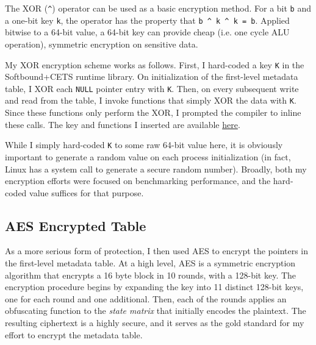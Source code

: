 \documentclass{article}
\begin{document}
        The XOR (\verb|^|) operator can be used as a basic encryption method. For a
        bit \verb|b| and a one-bit key \verb|k|, the operator has the property
        that \verb|b ^ k ^ k = b|. Applied bitwise to a 64-bit value, a 64-bit
        key can provide cheap (i.e. one cycle ALU operation), symmetric 
        encryption on sensitive data.

        \bigbreak{}

        My XOR encryption scheme works as follows. First, I hard-coded a key 
        \verb|K| in the Softbound+CETS runtime library. On initialization of
        the first-level metadata table, I XOR each \verb|NULL| pointer entry
        with \verb|K|. Then, on every subsequent write and read from the table,
        I invoke functions that simply XOR the data with \verb|K|. Since these functions only perform the
        XOR, I prompted the compiler to inline these calls. The key and functions
        I inserted are available \href{https://github.com/parthsarkar17/softboundcets-ese5370/blob/cb8179270000b386616802f150f010230129f169/llvm-project/compiler-rt/lib/softboundcets/softboundcets.cpp#L176}{here}.

        \bigbreak{}

        While I simply hard-coded \verb|K| to some raw 64-bit value here, it 
        is obviously important to generate a random value on each process
        initialization (in fact, Linux has a system call to generate a secure
        random number). Broadly, both my encryption efforts were focused on
        benchmarking performance, and the hard-coded value suffices for that purpose.

    \subsection{AES Encrypted Table}
    
        As a more serious form of protection, I then used AES to encrypt the pointers 
        in the first-level metadata table. At a high level, AES is a symmetric encryption
        algorithm that encrypts a 16 byte block in 10 rounds, with a 128-bit key.
        The encryption procedure begins by expanding the key into 11 distinct 128-bit
        keys, one for each round and one additional. Then, each of the rounds
        applies an obfuscating function to the \textit{state matrix} that initially encodes 
        the plaintext. The resulting ciphertext is a highly secure, and it serves
        as the gold standard for my effort to encrypt the metadata table.
\end{document}
